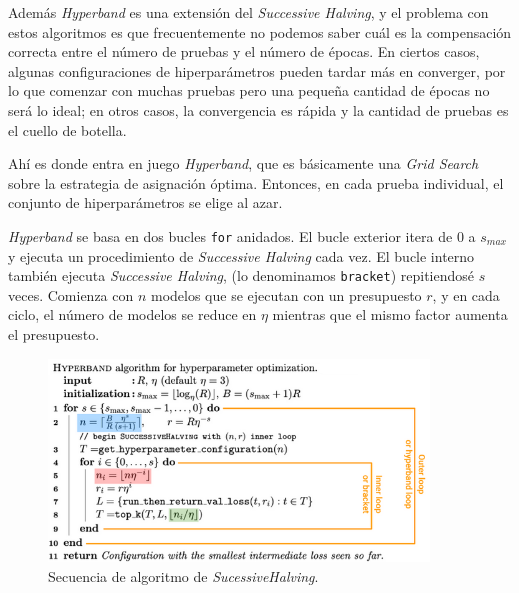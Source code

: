 \documentclass[a4paper,12pt]{article}
\begin{document}
Además \textit{Hyperband} es una extensión del \textit{Successive Halving}, y el problema con estos algoritmos es que frecuentemente no podemos saber cuál es la compensación correcta entre el número de pruebas y el número de épocas. En ciertos casos, algunas configuraciones de hiperparámetros pueden tardar más en converger, por lo que comenzar con muchas pruebas pero una pequeña cantidad de épocas no será lo ideal; en otros casos, la convergencia es rápida y la cantidad de pruebas es el cuello de botella. \citep{Rosenberg2020Aug}

Ahí es donde entra en juego \textit{Hyperband}, que es básicamente una \textit{Grid Search} sobre la estrategia de asignación óptima. Entonces, en cada prueba individual, el conjunto de hiperparámetros se elige al azar.

\textit{Hyperband} se basa en dos bucles \texttt{for} anidados. El bucle exterior itera de $0$ a $s_{max}$ y ejecuta un procedimiento de \textit{Successive Halving} cada vez. El bucle interno también ejecuta \textit{Successive Halving}, (lo denominamos \texttt{bracket}) repitiendosé $s$ veces. Comienza con $n$ modelos que se ejecutan con un presupuesto $r$, y en cada ciclo, el número de modelos se reduce en $\eta$ mientras que el mismo factor aumenta el presupuesto. \citep{Abraham2021Feb}

\begin{figure}[H]
	\begin{center}
	\includegraphics[width=0.9\textwidth]{hyperband_algo.png}
  	\caption{Secuencia de algoritmo de \textit{SucessiveHalving}.}
  	\label{fig:hyper_algo}
  	\end{center}
\end{figure}
\end{document}
